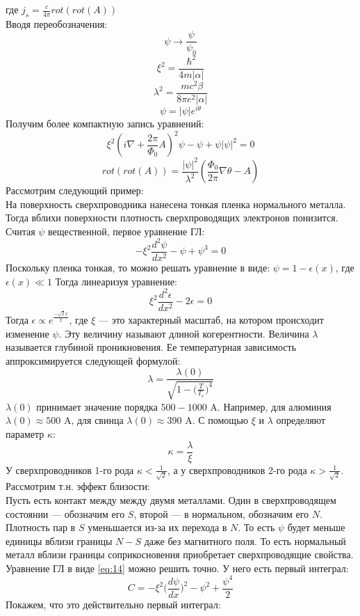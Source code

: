 \documentclass[a4paper]{article}
\begin{document}
где $j_s=\frac{c}{4\pi}rot(rot(A))$\\
Вводя переобозначения:
$$\psi\to\frac{\psi}{\psi_0}$$
$$\xi^2=\frac{\hbar^2}{4m|\alpha|}$$
$$\lambda^2=\frac{mc^2\beta}{8\pi e^2|\alpha|}$$
$$\psi=|\psi|e^{i\theta}$$
Получим более компактную запись уравнений:
$$ \xi^2(i\nabla+\frac{2\pi}{\Phi_0}A)^2\psi-\psi+\psi|\psi|^2=0 $$
$$ rot(rot(A))=\frac{|\psi|^2}{\lambda^2}(\frac{\Phi_0}{2\pi}\nabla\theta-A) $$
Рассмотрим следующий пример:\\
На поверхность сверхпроводника нанесена тонкая пленка нормального металла. Тогда вблихи поверхности плотность сверхпроводящих электронов понизится. Считая $\psi$ вещественной, первое уравнение ГЛ:
\begin{equation} \label{eq:14}
-\xi^2\frac{d^2\psi}{dx^2}-\psi+\psi^3=0
\end{equation}
Поскольку пленка тонкая, то можно решать уравнение в виде: $\psi=1-\epsilon(x)$, где $\epsilon(x)\ll1$
Тогда линеаризуя уравнение:\\
$$\xi^2\frac{d^2\epsilon}{dx^2}-2\epsilon=0$$
Тогда $\epsilon\propto e^{\frac{-\sqrt{2}x}{\xi}}$, где $\xi$ --- это характерный масштаб, на котором происходит изменение $\psi$. Эту величину называют длиной когерентности. Величина $\lambda$ называется глубиной проникновения. Ее температурная зависимость аппроксимируется следующей формулой:
$$\lambda=\frac{\lambda(0)}{\sqrt{1-\displaystyle\bigg(\frac{T}{T_c}\bigg)^4}}$$
$\lambda(0)$ принимает значение порядка $500-1000$ A. Например, для алюминия $\lambda(0)\approx500$ A, для свинца $\lambda(0)\approx390$ A.
\newpage
С помощью $\xi$ и $\lambda$ определяют параметр $\kappa$:
\begin{equation} \label{eq:15}
\kappa=\frac{\lambda}{\xi}
\end{equation}
У сверхпроводников 1-го рода $\kappa<\frac{1}{\sqrt2}$, а у сверхпроводников 2-го рода $\kappa>\frac{1}{\sqrt2}$.
Рассмотрим т.н. эффект близости:\\
Пусть есть контакт между между двумя металлами. Один в сверхпроводящем состоянии --- обозначим его $S$, второй --- в нормальном, обозначим его $N$. Плотность пар в $S$ уменьшается из-за их перехода в $N$. То есть $\psi$ будет меньше единицы вблизи границы $N-S$ даже без магнитного поля. То есть нормальный металл вблизи границы соприкосновения приобретает сверхпроводящие свойства.\\
Уравнение ГЛ в виде \ref{eq:14} можно решить точно. У него есть первый интеграл:
$$ C=-\xi^2\bigg(\frac{d\psi}{dx}\bigg)^2-\psi^2+\frac{\psi^4}{2} $$
Покажем, что это действительно первый интеграл:\\
\end{document}
